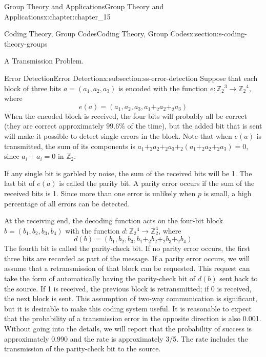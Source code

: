 \documentclass[oneside,10pt,]{book}
\numberwithin{equation}{section}
\begin{document}
\begin{chapterptx}{Group Theory and Applications}{}{Group Theory and Applications}{}{}{x:chapter:chapter_15}
\begin{sectionptx}{Coding Theory, Group Codes}{}{Coding Theory, Group Codes}{}{}{x:section:s-coding-theory-groups}
\begin{introduction}{A Transmission Problem.}
\end{introduction}%
%
%
\typeout{************************************************}
\typeout{************************************************}
%
\begin{subsectionptx}{Error Detection}{}{Error Detection}{}{}{x:subsection:ss-error-detection}
Suppose that each block of three bits \(a = \left(a_1, a_2 , a_3 \right)\) is encoded with the function \(e: \mathbb{Z}_2{}^3\to \mathbb{Z}_2{}^4\), where%
\begin{equation*}
e(a) = \left(a _1, a _2 , a _3, a_1+_2a_2+_2a_3 \right)
\end{equation*}
When the encoded block is received, the four bits will probably all be correct (they are correct approximately \(99.6\%\) of the time), but the added bit that is sent will make it possible to detect single errors in the block. Note that when \(e(a)\) is transmitted, the sum of its components is \(a_1+_2 a_2 +_2 a_3+_2 \left( a_1+_2 a_2+_2 a_3\right)= 0\), since  \(a_i+a_i=0\) in \(\mathbb{Z}_2\).%
\par
If any single bit is garbled by noise, the sum of the received bits will be 1. The last bit of \(e(a)\) is called the parity bit. A parity error occurs if the sum of the received bits is 1. Since more than one error is unlikely when \(p\) is small, a high percentage of all errors can be detected.%
\par
At the receiving end, the decoding function acts on the four-bit block \(b = \left(b_1,b _2 ,b_3,b_4 \right)\) with the function  \(d: \mathbb{Z}_2{}^4\to \mathbb{Z}_2^4\), where%
\begin{equation*}
d(b) = \left(b_1,b _2 ,b_3,b_1+_2b _2 +_2b_3+_2b_4 \right)
\end{equation*}
The fourth bit is called the parity-check bit. If no parity error occurs, the first three bits are recorded as part of the message. If a parity error occurs, we will assume that a retransmission of that block can be requested. This request can take the form of automatically having the parity-check bit of \(d(b)\) sent back to the source. If 1 is received, the previous block is retransmitted; if 0 is received, the next block is sent. This assumption of two-way communication is significant, but it is desirable to make this coding system useful. It is reasonable to expect that the probability of a transmission error in the opposite direction is also 0.001.  Without going into the details, we will report that the probability of success is approximately 0.990 and the rate is approximately 3\slash{}5. The rate includes the transmission of the parity-check bit to the source.%

\end{subsectionptx}
\end{sectionptx}
\end{chapterptx}
\end{document}
